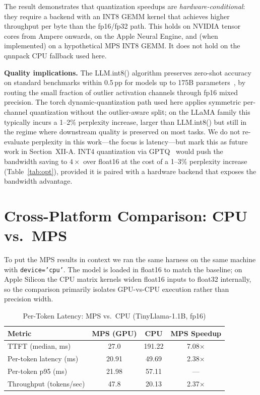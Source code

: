 \documentclass[conference]{IEEEtran}
\begin{document}
The result demonstrates that quantization speedups are
\emph{hardware-conditional}: they require a backend with an INT8
GEMM kernel that achieves higher throughput per byte than the
fp16/fp32 path. This holds on NVIDIA tensor cores from Ampere
onwards, on the Apple Neural Engine, and (when implemented) on a
hypothetical MPS INT8 GEMM. It does not hold on the qnnpack CPU
fallback used here.

\textbf{Quality implications.} The LLM.int8() algorithm preserves
zero-shot accuracy on standard benchmarks within 0.5\,pp for models up
to 175B parameters~\cite{dettmers2022}, by routing the small fraction
of outlier activation channels through fp16 mixed precision. The
torch dynamic-quantization path used here applies symmetric per-channel
quantization without the outlier-aware split; on the LLaMA family this
typically incurs a 1--2\% perplexity increase, larger than LLM.int8()
but still in the regime where downstream quality is preserved on most
tasks. We do not re-evaluate perplexity in this work---the focus is
latency---but mark this as future work in Section~XII-A. INT4
quantization via GPTQ~\cite{frantar2022} would push the bandwidth
saving to $4\times$ over float16 at the cost of a 1--3\% perplexity
increase (Table~\ref{tab:opt}), provided it is paired with a hardware
backend that exposes the bandwidth advantage.

\section{Cross-Platform Comparison: CPU vs.\ MPS}
\label{sec:cpuvsmps}

To put the MPS results in context we ran the same harness on the same
machine with \texttt{device='cpu'}. The model is loaded in float16 to
match the baseline; on Apple Silicon the CPU matrix kernels widen
float16 inputs to float32 internally, so the comparison primarily
isolates GPU-vs-CPU execution rather than precision width.

\begin{table}[!t]
  \centering
  \caption{Per-Token Latency: MPS vs.\ CPU (TinyLlama-1.1B, fp16)}
  \label{tab:cpu}
  \begin{tabular}{lccc}
    \toprule
    \textbf{Metric} & \textbf{MPS (GPU)} & \textbf{CPU} & \textbf{MPS Speedup} \\
    \midrule
    TTFT (median, ms)        & 27.0  & 191.22 & 7.08$\times$ \\
    Per-token latency (ms)   & 20.91 & 49.69  & 2.38$\times$ \\
    Per-token p95 (ms)       & 21.98 & 57.11  & --- \\
    Throughput (tokens/sec)  & 47.8  & 20.13  & 2.37$\times$ \\
    \bottomrule
  \end{tabular}
\end{table}
\end{document}
